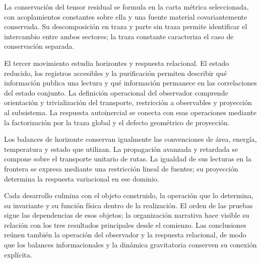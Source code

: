 La conservación del tensor residual se formula en la carta métrica
seleccionada, con acoplamientos constantes sobre ella y una fuente
material covariantemente conservada. Su descomposición en traza y parte
sin traza permite identificar el intercambio entre ambos sectores;
la traza constante caracteriza el caso de conservación separada.

El tercer movimiento estudia horizontes y respuesta relacional. El estado
reducido, los registros accesibles y la purificación permiten describir
qué información publica una lectura y qué información permanece en las
correlaciones del estado conjunto. La definición operacional del
observador comprende orientación y trivialización del transporte,
restricción a observables y proyección al subsistema. La respuesta
autoinercial se conecta con esas operaciones mediante la factorización
por la traza global y el defecto geométrico de proyección.

Los balances de horizonte conservan igualmente las convenciones de
área, energía, temperatura y estado que utilizan.
La propagación avanzada y retardada se compone sobre el transporte
unitario de rutas. La igualdad de sus lecturas en la frontera se
expresa mediante una restricción lineal de fuentes; su proyección
determina la respuesta variacional en ese dominio.

Cada desarrollo culmina con el objeto construido, la operación que lo
determina, su invariante y su función física dentro de la realización.
El orden de las pruebas sigue las dependencias de esos objetos; la
organización narrativa hace visible su relación con los tres resultados
principales desde el comienzo. Las conclusiones reúnen también la
operación del observador y la respuesta relacional, de modo que los
balances informacionales y la dinámica gravitatoria conserven su
conexión explícita.
